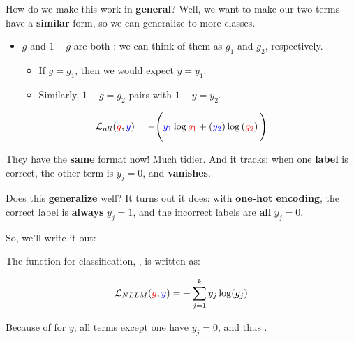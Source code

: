         How do we make this work in \textbf{general}? Well, we want to make our two terms have a \textbf{similar} form, so we can generalize to more classes.
        
        \begin{itemize}
            \item $g$ and $1-g$ are both : we can think of them as $g_1$ and $g_2$, respectively.
                \begin{itemize}
                    \item If $g=g_1$, then we would expect $y=y_1$.
                    \item Similarly, $1-g=g_2$ pairs with $1-y=y_2$.
                \end{itemize}
        \end{itemize}
        
        \begin{equation*}
            \mathcal{L}_{nll}
            (\textcolor{red}{g} , \textcolor{blue}{y})
            =
            -
            \Bigg(
                \textcolor{blue}{y_1} \log{\textcolor{red}{g_1}}
                +
                \left( \textcolor{blue}{y_2} \right)
                \log
                \left( \textcolor{red}{g_2} \right) 
            \Bigg)
        \end{equation*}
        
        They have the \textbf{same} format now! Much tidier. And it tracks: when one \textbf{label} is correct, the other term is $y_j=0$, and \textbf{vanishes}.
        
        Does this \textbf{generalize} well? It turns out it does: with \textbf{one-hot encoding}, the correct label is \textbf{always} $y_j=1$, and the incorrect labels are \textbf{all} $y_j=0$. 
        
        So, we'll write it out:\\
        
        \begin{kequation}
            The  function for  classification, , is written as:
            
            \begin{equation*}
                \mathcal{L}_{NLLM}
                (\textcolor{red}{g} , \textcolor{blue}{y})
                =
                -\sum_{j=1}^k
                y_j \log(g_j)
            \end{equation*}
            
            Because of  for $y$, all terms except one have $y_j=0$, and thus .
        \end{kequation}
        
